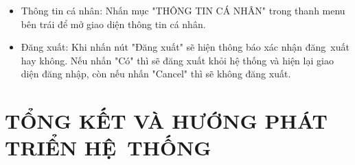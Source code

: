 \documentclass[a4paper,12pt]{report}
\begin{document}
\begin{itemize}
\begin{itemize}
\begin{enumerate}[label=B\arabic*:]
                    \item Làm mới dữ liệu: Nhấn "Làm mới" để xóa các trường và nhập lại
                    \item Xem danh sách thông tin kho nằm ở bên phải của giao diện
                \end{enumerate}
              \item Thông tin cá nhân: Nhấn mục "THÔNG TIN CÁ NHÂN" trong thanh menu bên trái để mở giao diện thông tin cá nhân.
              \item Đăng xuất: Khi nhấn nút "Đăng xuất" sẽ hiện thông báo xác nhận đăng~xuất hay không. Nếu nhấn "Có" thì sẽ đăng xuất khỏi hệ thống và hiện lại giao diện đăng nhập, còn nếu nhấn "Cancel" thì sẽ không đăng xuất.
          \end{itemize}
\end{itemize}

\chapter{TỔNG KẾT VÀ HƯỚNG PHÁT TRIỂN HỆ~THỐNG}
\end{document}

